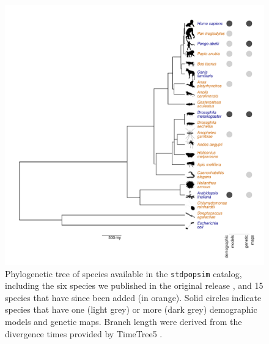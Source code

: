 \documentclass[hidelinks]{article}
\newcommand{\stdpopsim}{\texttt{stdpopsim}\xspace}
\begin{document}
\begin{figure}
    \includegraphics[width=\linewidth]{figs/species_fig}
	\caption{Phylogenetic tree of species available in the \stdpopsim catalog,
		including the six species we published in the original release \citep[in blue]{Adrion2020}, and 15 species that have since been added (in orange).
		Solid circles indicate species that have one (light grey) or more
		(dark grey) demographic models and genetic maps.
		Branch length were derived from the divergence times provided by TimeTree5 \citep{Kumar2022}.
	\label{fig:tree} }
\end{figure}
\end{document}
